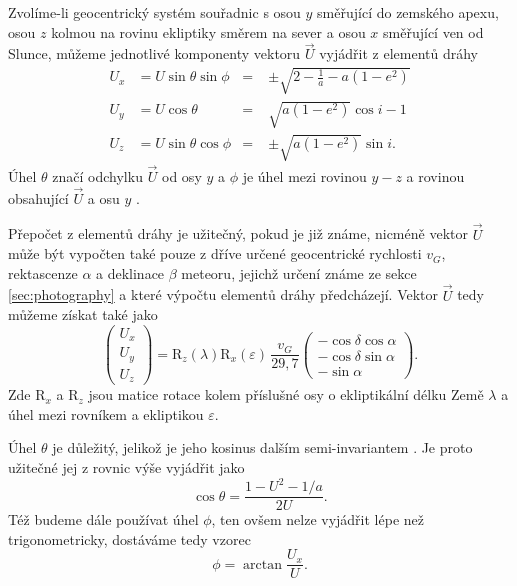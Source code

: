 Zvolíme-li geocentrický systém souřadnic s osou $y$ směřující do zemského apexu, osou $z$ kolmou na rovinu ekliptiky směrem na sever a osou $x$ směřující ven od Slunce, můžeme jednotlivé komponenty vektoru $\vec{U}$ vyjádřit z elementů dráhy \cite{newapproach}
\begin{equation}
    \begin{aligned}
        U_x & = U\sin{\theta}\sin{\phi} & =\; & \pm\sqrt{2-\frac{1}{a}-a(1-e^2)}  \\
        U_y & = U\cos{\theta}           & =\; & \sqrt{a(1-e^2)}\cos{i}-1          \\
        U_z & = U\sin{\theta}\cos{\phi} & =\; & \pm\sqrt{a(1-e^2)}\sin{i}\text{.}
    \end{aligned}
    \label{eqn:geocentric:u}
\end{equation}
Úhel $\theta$ značí odchylku $\vec{U}$ od osy $y$ a $\phi$ je úhel mezi rovinou $y\!-\!z$ a rovinou obsahující $\vec{U}$ a osu $y$ \cite{newapproach}.

Přepočet z elementů dráhy je užitečný, pokud je již známe, nicméně vektor $\vec{U}$ může být vypočten také pouze z dříve určené geocentrické rychlosti $v_G$, rektascenze $\alpha$ a deklinace $\beta$ meteoru, jejichž určení známe ze sekce \ref{sec:photography} a které výpočtu elementů dráhy předcházejí. Vektor $\vec{U}$ tedy můžeme získat také jako \cite{newapproach}
\begin{equation}
    \begin{pmatrix}
        U_x\\U_y\\U_z
    \end{pmatrix}=\text{R}_z(\lambda)\text{R}_x(\varepsilon)\,\frac{v_G}{29{,}7}\begin{pmatrix}
        -\cos{\delta}\cos{\alpha}\\
        -\cos{\delta}\sin{\alpha}\\
        -\sin{\alpha}
    \end{pmatrix}\text{.}
\end{equation}
Zde $\text{R}_x$ a $\text{R}_z$ jsou matice rotace kolem příslušné osy o ekliptikální délku Země $\lambda$ a úhel mezi rovníkem a ekliptikou $\varepsilon$.

\medskip

Úhel $\theta$ je důležitý, jelikož je jeho kosinus dalším semi-invariantem \cite{newapproach}. Je proto užitečné jej z rovnic výše vyjádřit jako \cite{newapproach}
\begin{equation}
    \cos{\theta}=\frac{1-U^2-1/a}{2U}\text{.}
\end{equation}
Též budeme dále používat úhel $\phi$, ten ovšem nelze vyjádřit lépe než trigonometricky, dostáváme tedy vzorec \cite{newapproach}
\begin{equation}
    \phi=\arctan{\frac{U_x}{U}}\text{.}
\end{equation}

